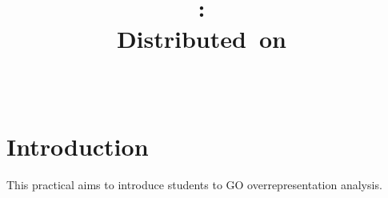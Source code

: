 \documentclass{article}
\title{
\vspace{2in}
\textmd{\textbf{\hmwkClass:\ \hmwkTitle}}\\
\normalsize\vspace{0.1in}\small{Distributed\ on\ \hmwkDueDate}\\
\vspace{0.1in}\large{\textit{\hmwkClassInstructor\ \hmwkClassTime}}
\vspace{3in}
}
\author{\textbf{\hmwkAuthorName}}
\date{} %
\begin{document}
\maketitle



\newpage
\tableofcontents
\newpage



\section{Introduction} %

\label{ch:introduction} %


This practical aims to introduce students to GO overrepresentation analysis.
\end{document}
